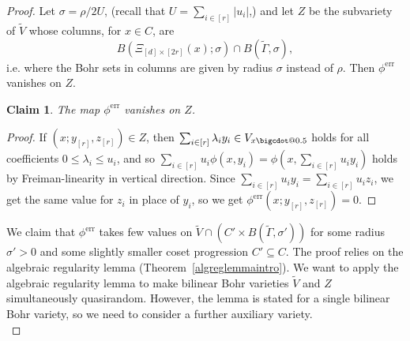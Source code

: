 \documentclass[a4paper,11pt]{article}
\makeatletter
\numberwithin{theorem}{section}
\newtheorem{claim}[theorem]{Claim}
\theoremstyle{definition}
\newcommand*\bcdot{\mathpalette\bigcdot@{0.5}}
\newcommand*\bigcdot@[2]{\mathbin{\vcenter{\hbox{\scalebox{#2}{$\m@th#1\bullet$}}}}}
\makeatother
\begin{document}
\begin{proof}
    \vspace{\baselineskip}
    
    Let $\sigma = \rho / 2U$, (recall that $U = \sum_{i \in [r]} |u_i|$,) and let $Z$ be the subvariety of $\tilde{V}$ whose columns, for $x \in C$, are
    \[B(\Xi_{[d] \times [2r]}(x); \sigma) \cap B(\tilde{\Gamma}, \sigma),\]
    i.e. where the Bohr sets in columns are given by radius $\sigma$ instead of $\rho$. Then $\phi^{\text{err}}$ vanishes on $Z$.
    
    \vspace{\baselineskip}
    
    \begin{claim}\label{phierrvanishingz}
        The map $\phi^{\text{err}}$ vanishes on $Z$.
    \end{claim}
    
    \begin{proof}
        If $(x; y_{[r]}, z_{[r]}) \in Z$, then $\sum_{i\in [r]} \lambda_i y_i \in V_{x \bcdot}$ holds for all coefficients $0 \leq \lambda_i \leq u_i$, and so $\sum_{i\in [r]} u_i \phi(x, y_i)  = \phi(x, \sum_{i\in [r]} u_i y_i)$ holds by Freiman-linearity in vertical direction. Since $\sum_{i\in [r]} u_i y_i= \sum_{i\in [r]} u_i z_i$, we get the same value for $z_i$ in place of $y_i$, so we get $\phi^{\text{err}}(x; y_{[r]}, z_{[r]}) = 0$.
    \end{proof}
    
    \vspace{\baselineskip}
    
    We claim that $\phi^{\text{err}}$ takes few values on $\tilde{V} \cap (C' \times B(\tilde{\Gamma}, \sigma'))$ for some radius $\sigma' > 0$ and some slightly smaller coset progression $C' \subseteq C$. The proof relies on the algebraic regularity lemma (Theorem~\ref{algreglemmaintro}). We want to apply the algebraic regularity lemma to make bilinear Bohr varieties $\tilde{V}$ and $Z$ simultaneously quasirandom. However, the lemma is stated for a single bilinear Bohr variety, so we need to consider a further auxiliary variety.\\
    
    
    
        
        

\end{proof}
\end{document}
